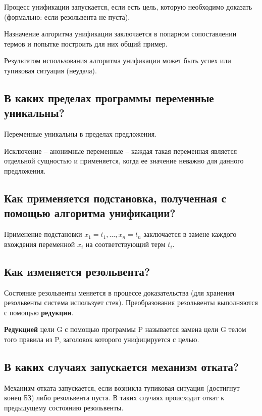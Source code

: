 \documentclass[a4paper,12pt]{article}
\begin{document}
	Процесс унификации запускается, если есть цель, которую необходимо доказать (формально: если резольвента не пуста).
	
	Назначение алгоритма унификации заключается в попарном сопоставлении термов и попытке построить для них общий пример. 
	
	Результатом использования алгоритма унификации может быть успех или тупиковая ситуация (неудача).
	
	\subsection*{В каких пределах программы переменные уникальны? }
	
	Переменные уникальны в пределах предложения.
	
	Исключение – анонимные переменные – каждая такая переменная является отдельной сущностью и применяется, когда ее значение неважно для данного предложения.
	
	\subsection*{Как применяется подстановка, полученная с помощью алгоритма унификации?}
	
	Применение подстановки ${x_1=t_1, …, x_n=t_n}$ заключается в замене каждого вхождения переменной $x_i$ на соответствующий терм $t_i$.
	
	\subsection*{Как изменяется резольвента?}
	
	Состояние резольвенты меняется в процессе доказательства (для хранения резольвенты система использует стек). Преобразования резольвенты выполняются с помощью {\bf редукции}.
	
	{\bf Редукцией} цели G с помощью программы P называется замена цели G телом того правила из P, заголовок которого унифицируется с целью.
	
	\subsection*{В каких случаях запускается механизм отката?}
	
	Механизм отката запускается, если возникла тупиковая ситуация (достигнут конец БЗ) либо резольвента пуста. В таких случаях происходит откат к предыдущему состоянию резольвенты.
	
\end{document}

